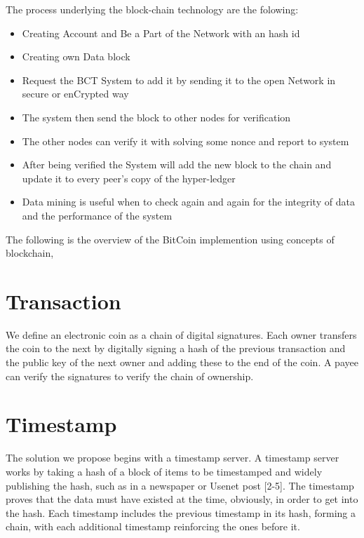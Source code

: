 \documentclass[a4paper,12pt]{report}
\begin{document}
The process underlying the block-chain technology are the folowing:
\begin{itemize}
\item Creating Account and Be a Part of the Network with an hash id
\item Creating own Data block
\item Request the BCT System to add it by sending it to the open Network in secure or enCrypted way
\item The system then send the block to other nodes for verification
\item The other nodes can verify it with solving some nonce and report to system
\item After being verified the System will add the new block to the chain and update it to every peer's copy of the hyper-ledger
\item Data mining is useful when to check again and again for the integrity of data and the performance of the system
\end{itemize}

The following is the overview of the BitCoin implemention using concepts of blockchain,

\section{Transaction}
We define an electronic coin as a chain of digital signatures. Each owner transfers the coin to the
next by digitally signing a hash of the previous transaction and the public key of the next owner
and adding these to the end of the coin. A payee can verify the signatures to verify the chain of
ownership.

\section{Timestamp}
The solution we propose begins with a timestamp server. A timestamp server works by taking a
hash of a block of items to be timestamped and widely publishing the hash, such as in a
newspaper or Usenet post [2-5]. The timestamp proves that the data must have existed at the
time, obviously, in order to get into the hash. Each timestamp includes the previous timestamp in
its hash, forming a chain, with each additional timestamp reinforcing the ones before it.
\end{document}
